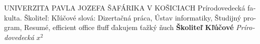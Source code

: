 \documentclass{report}
\begin{document}
\begin{otherlanguage}{slovak}
\MakeUppercase{Univerzita Pavla Jozefa Šafárika v Košiciach} Prírodovedecká fakulta. Školiteľ: Kľúčové slová: Dizertačná práca, Ústav informatiky, Študijný program, Resumé, efficient office fluff ďakujem ťažký ňuch \textbf{Školiteľ Kľúčové} \textit{Prírodovedecká} $x^2$
\end{otherlanguage}
\end{document}
